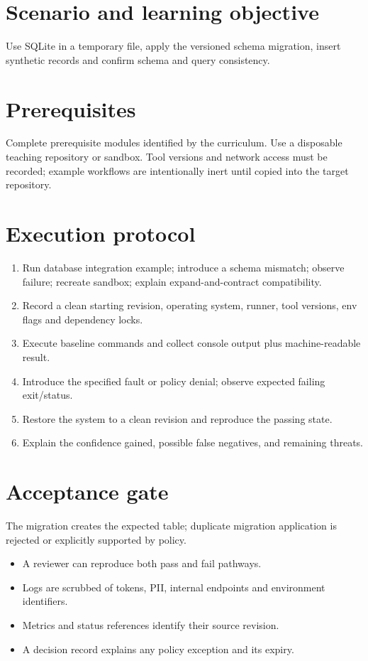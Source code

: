 \documentclass[11pt,letterpaper]{article}
\begin{document}
\makedoctitle
\makedocsummary
\tableofcontents
\clearpage
\section{Scenario and learning objective}
Use SQLite in a temporary file, apply the versioned schema migration, insert synthetic records and confirm schema and query consistency.

\section{Prerequisites}
Complete prerequisite modules identified by the curriculum. Use a disposable teaching repository or sandbox. Tool versions and network access must be recorded; example workflows are intentionally inert until copied into the target repository.

\section{Execution protocol}
\begin{enumerate}
\item Run database integration example; introduce a schema mismatch; observe failure; recreate sandbox; explain expand-and-contract compatibility.
\item Record a clean starting revision, operating system, runner, tool versions, env flags and dependency locks.
\item Execute baseline commands and collect console output plus machine-readable result.
\item Introduce the specified fault or policy denial; observe expected failing exit/status.
\item Restore the system to a clean revision and reproduce the passing state.
\item Explain the confidence gained, possible false negatives, and remaining threats.
\end{enumerate}
\section{Acceptance gate}
The migration creates the expected table; duplicate migration application is rejected or explicitly supported by policy.

\begin{itemize}
\item A reviewer can reproduce both pass and fail pathways.
\item Logs are scrubbed of tokens, PII, internal endpoints and environment identifiers.
\item Metrics and status references identify their source revision.
\item A decision record explains any policy exception and its expiry.
\end{itemize}
\end{document}
